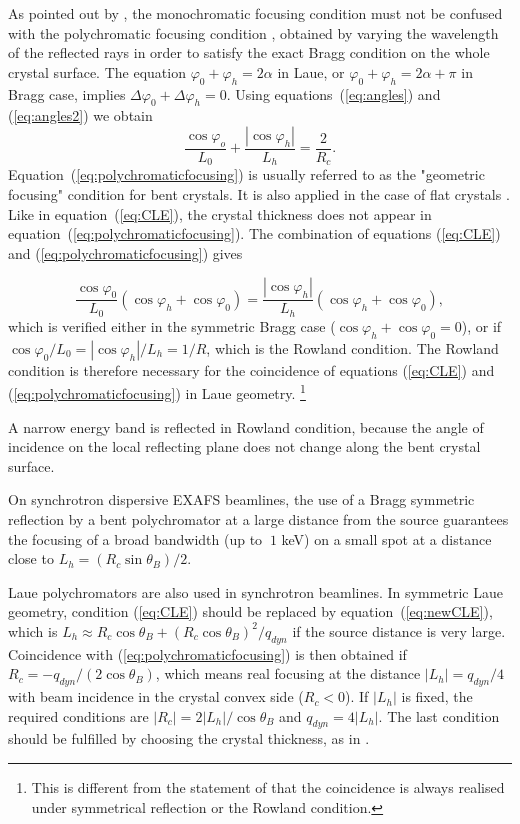 \documentclass[preprint]{iucr}              %
\begin{document}
As pointed out by \cite{CK}, the monochromatic focusing condition must not be confused with the polychromatic focusing condition  \cite{handbook,Caciuffo1987,Schulze1998,Martinson,martinson2017}, obtained by varying the wavelength of the reflected rays in order to satisfy the exact Bragg condition on the whole crystal surface.
The equation $\varphi_0+\varphi_h=2\alpha$ in Laue, or $\varphi_0+\varphi_h=2\alpha+\pi$ in Bragg case, implies $\Delta\varphi_0+\Delta\varphi_h=0$. Using equations~(\ref{eq:angles}) and  (\ref{eq:angles2}) we obtain
\begin{equation}
\label{eq:polychromaticfocusing}
\frac{{\cos {\varphi _o}}}{{{L_0}}} + \frac{{\left| {\cos {\varphi _h}} \right|}}{{{L_h}}} = \frac{2}{R_c}.
\end{equation}
Equation~(\ref{eq:polychromaticfocusing}) is usually referred to as the "geometric focusing" condition for bent crystals. It is also applied in the case of flat crystals \cite{sanchezdelrio1994}. Like in equation~(\ref{eq:CLE}), the crystal thickness does not appear in equation~(\ref{eq:polychromaticfocusing}).
The combination of equations (\ref{eq:CLE}) and (\ref{eq:polychromaticfocusing}) gives

\begin{equation}
\label{eq:coincidence}
\frac{\cos\varphi_0}{L_0}(\cos\varphi_h+\cos\varphi_0) = \frac{|\cos\varphi_h|}{L_h}(\cos\varphi_h+\cos\varphi_0),
\end{equation}
which is verified either in the symmetric Bragg case ($\cos\varphi_h+\cos\varphi_0=0$), or if $\cos\varphi_0/L_0=|\cos\varphi_h|/L_h=1/R$, which is the Rowland condition. The Rowland condition is therefore necessary for the coincidence of equations (\ref{eq:CLE}) and (\ref{eq:polychromaticfocusing}) in Laue geometry.
\footnote{This is different from the statement of \cite{CK} that the coincidence is always realised under symmetrical reflection or the Rowland condition.}

A narrow energy band is reflected in Rowland condition, because the angle of incidence on the local reflecting plane does not change along the bent crystal surface.

On synchrotron dispersive EXAFS beamlines, the use of a Bragg symmetric reflection by a bent polychromator at a large distance from the source guarantees the focusing of a broad bandwidth (up to $~1$ keV) on a small spot \cite{Tolentino:ms0206} at a distance close to $L_h=(R_c\sin\theta_B)/2$. 

Laue polychromators are also used in synchrotron beamlines.
In symmetric Laue geometry, condition (\ref{eq:CLE}) should be replaced by equation~(\ref{eq:newCLE}), which is $L_h \approx R_c \cos\theta_B + (R_c \cos\theta_B) ^2 / q_{dyn}$ if the source distance is very large.
Coincidence with (\ref{eq:polychromaticfocusing}) is then obtained if
$R_c=-q_{dyn}/(2\cos\theta_B)$,
which means real focusing at the distance $|L_h|=q_{dyn}/4$ with beam incidence in the crystal convex side ($R_c<0$). 
If $|L_h|$ is fixed, the required conditions are $|R_c| = 2 |L_h| / \cos\theta_B$ and $q_{dyn}=4|L_h|$. The last condition should be fulfilled by choosing the crystal thickness, as in  \cite{Mocella2004,Mocella2008}.
\end{document}
